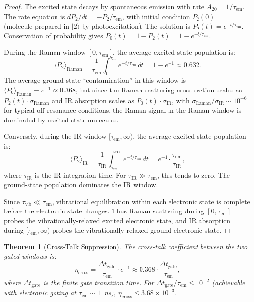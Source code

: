 \documentclass[11pt,twocolumn,a4paper]{article}
\newtheorem{theorem}{Theorem}[section]
\theoremstyle{definition}
\theoremstyle{remark}
\begin{document}
\begin{proof}
The excited state decays by spontaneous emission with rate $A_{20} = 1/\tau_{\mathrm{em}}$. The rate equation is $dP_2/dt = -P_2/\tau_{\mathrm{em}}$, with initial condition $P_2(0) = 1$ (molecule prepared in $|2\rangle$ by photoexcitation). The solution is $P_2(t) = e^{-t/\tau_{\mathrm{em}}}$. Conservation of probability gives $P_0(t) = 1 - P_2(t) = 1 - e^{-t/\tau_{\mathrm{em}}}$.

During the Raman window $[0, \tau_{\mathrm{em}}]$, the average excited-state population is:
\begin{equation}
\langle P_2 \rangle_{\mathrm{Raman}} = \frac{1}{\tau_{\mathrm{em}}} \int_0^{\tau_{\mathrm{em}}} e^{-t/\tau_{\mathrm{em}}} \, dt = 1 - e^{-1} \approx 0.632.
\end{equation}
The average ground-state ``contamination'' in this window is $\langle P_0 \rangle_{\mathrm{Raman}} = e^{-1} \approx 0.368$, but since the Raman scattering cross-section scales as $P_2(t) \cdot \sigma_{\mathrm{Raman}}$ and IR absorption scales as $P_0(t) \cdot \sigma_{\mathrm{IR}}$, with $\sigma_{\mathrm{Raman}} / \sigma_{\mathrm{IR}} \sim 10^{-6}$ for typical off-resonance conditions, the Raman signal in the Raman window is dominated by excited-state molecules.

Conversely, during the IR window $[\tau_{\mathrm{em}}, \infty)$, the average excited-state population is:
\begin{equation}
\langle P_2 \rangle_{\mathrm{IR}} = \frac{1}{\tau_{\mathrm{IR}}} \int_{\tau_{\mathrm{em}}}^{\infty} e^{-t/\tau_{\mathrm{em}}} \, dt = e^{-1} \cdot \frac{\tau_{\mathrm{em}}}{\tau_{\mathrm{IR}}},
\end{equation}
where $\tau_{\mathrm{IR}}$ is the IR integration time. For $\tau_{\mathrm{IR}} \gg \tau_{\mathrm{em}}$, this tends to zero. The ground-state population dominates the IR window.

Since $\tau_{\mathrm{vib}} \ll \tau_{\mathrm{em}}$, vibrational equilibration within each electronic state is complete before the electronic state changes. Thus Raman scattering during $[0, \tau_{\mathrm{em}}]$ probes the vibrationally-relaxed excited electronic state, and IR absorption during $[\tau_{\mathrm{em}}, \infty)$ probes the vibrationally-relaxed ground electronic state.
\end{proof}

\begin{theorem}[Cross-Talk Suppression]
\label{thm:crosstalk}
The cross-talk coefficient between the two gated windows is:
\begin{equation}
\eta_{\mathrm{cross}} = \frac{\Delta t_{\mathrm{gate}}}{\tau_{\mathrm{em}}} \cdot e^{-1} \approx 0.368 \cdot \frac{\Delta t_{\mathrm{gate}}}{\tau_{\mathrm{em}}},
\end{equation}
where $\Delta t_{\mathrm{gate}}$ is the finite gate transition time. For $\Delta t_{\mathrm{gate}} / \tau_{\mathrm{em}} \leq 10^{-2}$ (achievable with electronic gating at $\tau_{\mathrm{em}} \sim 1$~ns), $\eta_{\mathrm{cross}} \leq 3.68 \times 10^{-3}$.
\end{theorem}
\end{document}
